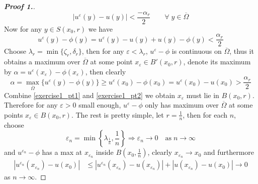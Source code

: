 \documentclass[12pt, oneside]{amsart}  	%
\begin{document}
\begin{proof}[\textbf{Proof 1.}]
\begin{equation*}
|u^\varepsilon(y) - u(y)| < \frac{-\alpha_r}{2} \qquad\forall\;y\in \overline{\Omega}
\end{equation*}
Now for any $y\in S(x_0,r)$ we have
\begin{equation}\label{exercise1_pt1}
u^\varepsilon(y) - \phi(y) = u^\varepsilon(y) - u(y)  + u(y) - \phi(y) < \frac{\alpha_r}{2}
\end{equation}
Choose $\lambda_r = \min\{\zeta_r,\delta_r\}$, then for any $\varepsilon<\lambda_r$, $u^\varepsilon - \phi$ is continuous on $\overline{\Omega}$, thus it obtains a maximum over $\overline{\Omega}$ at some point $x_\varepsilon \in B'(x_0,r)$, denote its maximum by $\alpha = u^\varepsilon (x_\varepsilon) - \phi(x_\varepsilon)$, then clearly
\begin{equation}\label{exercise1_pt2}
\alpha = \max_{\overline{\Omega}} \{u^\varepsilon(y) - \phi(y)\} \geq u^\varepsilon(x_0) - \phi(x_0) = u^\varepsilon(x_0) - u(x_0)  > \frac{\alpha_r}{2}
\end{equation}
Combine \eqref{exercise1_pt1} and \eqref{exercise1_pt2} we obtain $x_\varepsilon$ must lie in $B(x_0,r)$. Therefore for any $\varepsilon>0$ small enough, $u^\varepsilon -\phi$ only has maximum over $\overline{\Omega}$ at some points $x_\varepsilon \in B(x_0,r)$. The rest is pretty simple, let $r = \frac{1}{n}$, then for each $n$, choose 
\begin{equation*}
\varepsilon_n = \min\left\lbrace \lambda_{\frac{1}{n}},\frac{1}{n} \right\rbrace  \Longrightarrow \varepsilon_n \longrightarrow 0 \quad\text{as}\;n\longrightarrow\infty
\end{equation*}
and $u^{\varepsilon_n}- \phi$ has a max at $x_{\varepsilon_n}$ inside $B\left(x_0,\frac{1}{n}\right)$, clearly $x_{\varepsilon_n}\longrightarrow x_0$ and furthermore
\begin{align*}
\left|u^{\varepsilon_n}(x_{\varepsilon_n}) - u(x_0)\right|  &\leq \left|u^{\varepsilon_n}(x_{\varepsilon_n}) - u(x_{\varepsilon_n})\right|  + \left|u(x_{\varepsilon_n}) - u(x_0)\right|\longrightarrow 0
\end{align*}
as $n\longrightarrow \infty$.
\end{proof}
\end{document}
